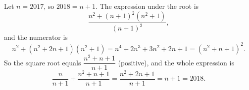 Let $n=2017$, so $2018=n+1$. The expression under the root is
\[
\dfrac{n^2+(n+1)^2\left(n^2+1\right)}{(n+1)^2},
\]
and the numerator is
\[
n^2+\left(n^2+2n+1\right)\left(n^2+1\right)=n^4+2n^3+3n^2+2n+1=\left(n^2+n+1\right)^2 .
\]
So the square root equals $\dfrac{n^2+n+1}{n+1}$ (positive), and the whole expression is
\[
\dfrac{n}{n+1}+\dfrac{n^2+n+1}{n+1}=\dfrac{n^2+2n+1}{n+1}=n+1=\boxed{2018}.
\]
